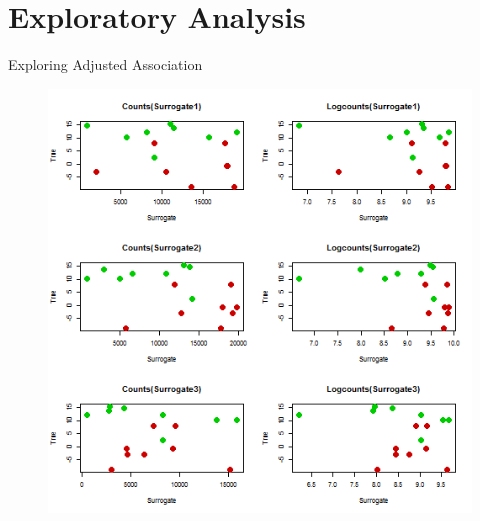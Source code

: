\documentclass[a4paper,9pt]{beamer}\usepackage[]{graphicx}\usepackage[]{color}
\begin{document}

\section{Exploratory Analysis}

\begin{frame}{Exploring Adjusted Association}
\begin{minipage}{0.3\textwidth}
\begin{figure}[H]
\includegraphics[scale=0.3]{first_presentation-figure/exploration-1.png}
\end{figure}
\end{minipage}
\hfill
\begin{minipage}{0.40\textwidth}
\begin{figure}[H]

\end{figure}
\end{minipage}
\end{frame}
\end{document}
